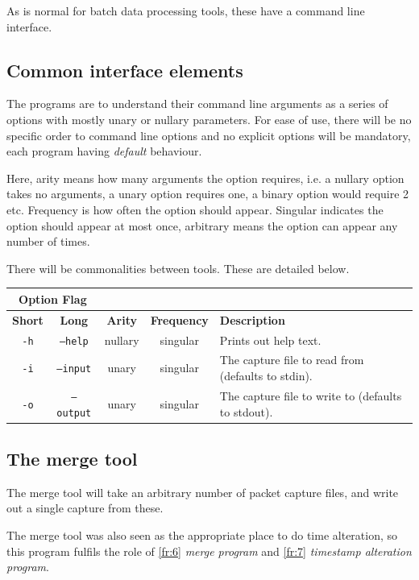 \documentclass[10pt,a4paper,notitlepage]{report}
\begin{document}
As is normal for batch data processing tools, these have a command line interface.

\subsection{Common interface elements}
The programs are to understand their command line arguments as a series of options with mostly unary or nullary parameters. For ease of use, there will be no specific order to command line options and no explicit options will be mandatory, each program having \emph{default} behaviour.

Here, arity means how many arguments the option requires, i.e. a nullary option takes no arguments,  a unary option requires one, a binary option would require 2 etc.
Frequency is how often the option should appear. Singular indicates the option should appear at most once, arbitrary means the option can appear any number of times.

There will be commonalities between tools. These are detailed below.

\begin{tabularx}{\textwidth}{|c|c|c|c|X|}
\cline{1-2}
\multicolumn{2}{|c|}{\textbf{Option Flag}} & \multicolumn{3}{c}{}\\ \hline
\textbf{Short} & \textbf{Long} & \textbf{Arity} & \textbf{Frequency} & \textbf{Description} \\ \hline
\texttt{-h} & \texttt{--help} & nullary & singular & Prints out help text.\\\hline
\texttt{-i} & \texttt{--input} & unary & singular & The capture file to read from (defaults to stdin).\\ \hline
\texttt{-o} & \texttt{--output} & unary & singular & The capture file to write to (defaults to stdout).\\ \hline
\end{tabularx}

\subsection{The merge tool}
The merge tool will take an arbitrary number of packet capture files, and write out a single capture from these.

The merge tool was also seen as the appropriate place to do time alteration, so this program fulfils the role of \ref{fr:6} \emph{merge program} and \ref{fr:7} \emph{timestamp alteration program}.
\end{document}
